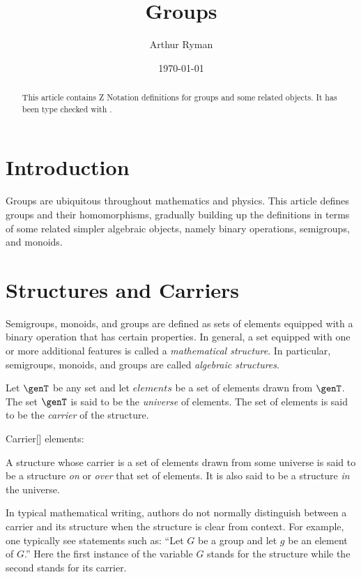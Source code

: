\documentclass{amsart}
\begin{document}
\title{Groups}
\author{Arthur Ryman}
\date{\today}

\begin{abstract}
This article contains Z Notation definitions for groups and some related objects.
It has been type checked with \fuzz.
\end{abstract}

\maketitle

\tableofcontents

\section{Introduction}

Groups are ubiquitous throughout mathematics and physics.
This article defines groups and their homomorphisms,
gradually building up the definitions in terms of some related simpler algebraic objects,
namely binary operations, semigroups, and monoids.

\section{Structures and Carriers}

Semigroups, monoids, and groups are defined as sets of elements equipped with a binary operation that has certain properties.
In general, a set equipped with one or more additional features is called a \textit{mathematical structure}.
In particular, semigroups, monoids, and groups are called \textit{algebraic structures}. 

Let $\genT$ be any set and let $elements$ be a set of elements drawn from $\genT$.
The set $\genT$ is said to be the \textit{universe} of elements.
The set of elements is said to be the \textit{carrier} of the structure.
\begin{schema}{Carrier}[\genT]
	elements: \power \genT
\end{schema}

A structure whose carrier is a set of elements drawn from some universe is said to be a structure \textit{on} or \textit{over} that set of elements.
It is also said to be a structure \textit{in} the universe.

In typical mathematical writing, authors do not normally distinguish between a carrier and its structure
when the structure is clear from context.
For example, one typically see statements such as:  
``Let $G$ be a group and let $g$ be an element of $G$.''
Here the first instance of the variable $G$ stands for the structure while the second stands for its carrier.
\end{document}
